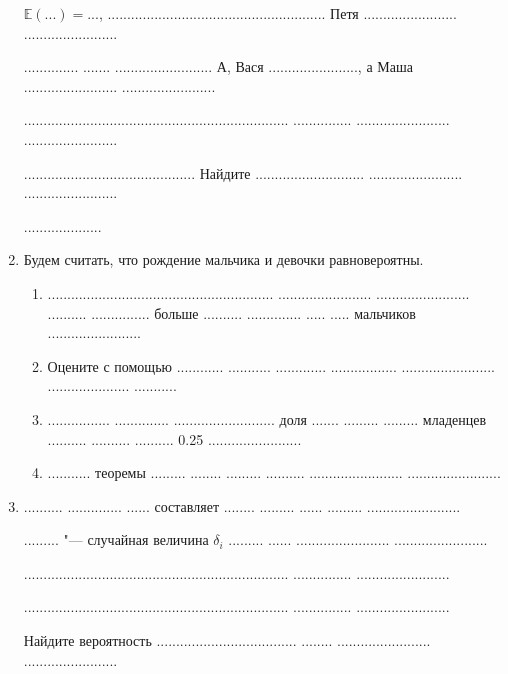 \documentclass[10pt,a4paper]{article}
\newcommand{\E}{\mathbb{E}}
\begin{document}
\begin{enumerate}
$\E(...)=...$, ........................................................ Петя ........................ ........................

.............. ....... ......................... А, Вася ......................., а Маша ........................ ........................

.................................................................... ............... ........................ ........................

............................................ Найдите ............................ ........................ ........................

....................


\item Будем считать, что рождение мальчика и девочки равновероятны.
\begin{enumerate}
\item .......................................................... ........................ ........................
 .......... ............... больше .......... .............. ..... ..... мальчиков ........................
\item Оцените с помощью ............ ........... ............. ................. ........................ ..................... ...........
\item ................ .............. .......................... доля ....... ......... ......... младенцев .......... .......... ..........  0.25 ........................
\item ........... теоремы ......... ........ ......... .......... ........................ ........................
\end{enumerate}

\item .......... .............. ...... составляет ........ ......... ...... ......... ........................

.........  "--- случайная величина $\delta_i$ ......... ...... ........................ ........................

.................................................................... ............... ........................

.................................................................... ............... ........................


Найдите вероятность ....................................   ........ ........................ ........................


\end{enumerate}
\end{document}
